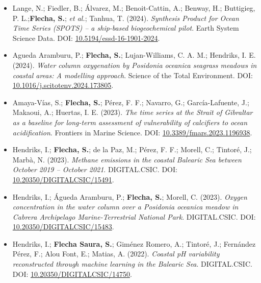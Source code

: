 \documentclass[11pt,a4paper]{article}
\begin{document}
\begin{itemize}[leftmargin=*]
    \item Lange, N.; Fiedler, B.; Álvarez, M.; Benoit-Cattin, A.; Benway, H.; Buttigieg, P. L.;\textbf{Flecha, S.}; \textit{et al.}; Tanhua, T. (2024).
    \textit{Synthesis Product for Ocean Time Series (SPOTS) – a ship-based biogeochemical pilot}.
    Earth System Science Data.
    DOI: \href{https://doi.org/10.5194/essd-16-1901-2024}{10.5194/essd-16-1901-2024}.

    \item Agueda Aramburu, P.; \textbf{Flecha, S.}; Lujan-Williams, C. A. M.; Hendriks, I. E. (2024).
    \textit{Water column oxygenation by \textit{Posidonia oceanica} seagrass meadows in coastal areas: A modelling approach}.
    Science of the Total Environment.
    DOI: \href{https://doi.org/10.1016/j.scitotenv.2024.173805}{10.1016/j.scitotenv.2024.173805}.

    \item Amaya-Vías, S.; \textbf{Flecha, S.}; Pérez, F. F.; Navarro, G.; García-Lafuente, J.; Makaoui, A.; Huertas, I. E. (2023).
    \textit{The time series at the Strait of Gibraltar as a baseline for long-term assessment of vulnerability of calcifiers to ocean acidification}.
    Frontiers in Marine Science.
    DOI: \href{https://doi.org/10.3389/fmars.2023.1196938}{10.3389/fmars.2023.1196938}.

    \item Hendriks, I.; \textbf{Flecha, S.}; de la Paz, M.; Pérez, F. F.; Morell, C.; Tintoré, J.; Marbà, N. (2023).
    \textit{Methane emissions in the coastal Balearic Sea between October 2019 – October 2021}.
    DIGITAL.CSIC.
    DOI: \href{https://doi.org/10.20350/DIGITALCSIC/15491}{10.20350/DIGITALCSIC/15491}.

    \item Hendriks, I.; Águeda Aramburu, P.; \textbf{Flecha, S.}; Morell, C. (2023).
    \textit{Oxygen concentration in the water column over a \textit{Posidonia oceanica} meadow in Cabrera Archipelago Marine-Terrestrial National Park}.
    DIGITAL.CSIC.
    DOI: \href{https://doi.org/10.20350/DIGITALCSIC/15483}{10.20350/DIGITALCSIC/15483}.

    \item Hendriks, I.; \textbf{Flecha Saura, S.}; Giménez Romero, A.; Tintoré, J.; Fernández Pérez, F.; Alou Font, E.; Matias, A. (2022).
    \textit{Coastal pH variability reconstructed through machine learning in the Balearic Sea}.
    DIGITAL.CSIC.
    DOI: \href{https://doi.org/10.20350/DIGITALCSIC/14750}{10.20350/DIGITALCSIC/14750}.


\end{itemize}
\end{document}
